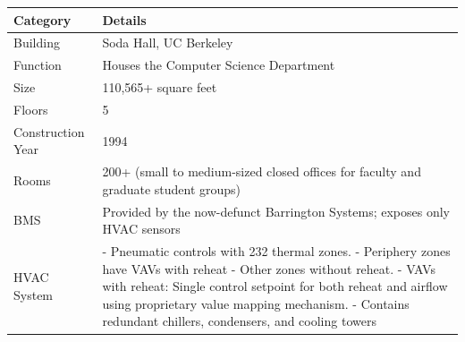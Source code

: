 \begin{table}[!t]
\begin{tabular}{p{4cm}|p{10cm}}
\hline \hline
\textbf{Category}                & \textbf{Details}                                                                                     \bigstrut  \\ \hline
Building               & Soda Hall, UC Berkeley                                                                               \bigstrut   \\ \hline
Function                & Houses the Computer Science Department
\bigstrut   \\ \hline
Size                & 110,565+ square feet
\bigstrut    \\ \hline
Floors                  & 5                                                       \bigstrut   \\ \hline
Construction Year       & 1994\bigstrut    \\ \hline
Rooms                   & 200+ (small to medium-sized closed offices for faculty and graduate student groups)                       \bigstrut    \\ \hline
\acf{BMS} & Provided by the now-defunct Barrington Systems; exposes only \ac{HVAC} sensors                  \bigstrut    \\ \hline
\ac{HVAC} System              & - Pneumatic controls with 232 thermal zones. \newline - Periphery zones have \acp{VAV} with reheat \newline - Other zones without reheat. \newline - \acp{VAV} with reheat: Single control setpoint for both reheat and airflow using proprietary value mapping mechanism.  \newline - Contains redundant chillers, condensers, and cooling towers
\bigstrut   \\ \hline
\end{tabular}
\end{table}

